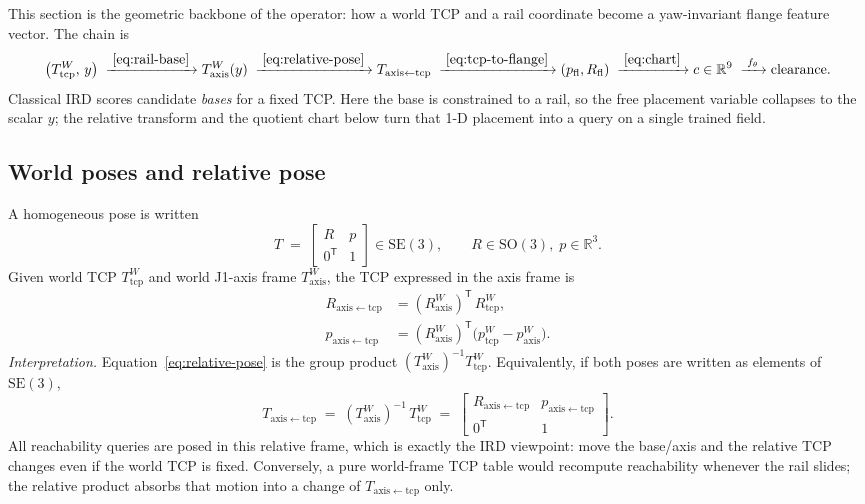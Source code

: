 \documentclass[11pt,a4paper]{article}
\newcommand{\SE}{\mathrm{SE}}
\newcommand{\SO}{\mathrm{SO}}
\newcommand{\R}{\mathbb{R}}
\newcommand{\Tcp}{T_{\mathrm{tcp}}}
\newcommand{\Taxis}{T_{\mathrm{axis}}}
\begin{document}
This section is the geometric backbone of the operator: how a world TCP and a
rail coordinate become a yaw-invariant flange feature vector. The chain is
\begin{equation}
\label{eq:pipeline}
  \bigl(\Tcp^{W},\, y\bigr)
  \;\xrightarrow{\;\eqref{eq:rail-base}\;}
  \Taxis^{W}(y)
  \;\xrightarrow{\;\eqref{eq:relative-pose}\;}
  T_{\mathrm{axis\leftarrow tcp}}
  \;\xrightarrow{\;\eqref{eq:tcp-to-flange}\;}
  (p_{\mathrm{fl}},R_{\mathrm{fl}})
  \;\xrightarrow{\;\eqref{eq:chart}\;}
  c\in\R^{9}
  \;\xrightarrow{\;f_{\theta}\;}
  \text{clearance}.
\end{equation}
Classical IRD scores candidate \emph{bases} for a fixed TCP. Here the base is
constrained to a rail, so the free placement variable collapses to the scalar
\(y\); the relative transform and the quotient chart below turn that 1-D
placement into a query on a single trained field.

\subsection{World poses and relative pose}
\label{sec:frames}

A homogeneous pose is written
\begin{equation}
\label{eq:pose-matrix}
  T
  \;=\;
  \begin{bmatrix}
    R & p \\
    0^{\mathsf T} & 1
  \end{bmatrix}
  \in\SE(3),
  \qquad
  R\in\SO(3),\; p\in\R^{3}.
\end{equation}
Given world TCP \(\Tcp^{W}\) and world J1-axis frame \(\Taxis^{W}\), the TCP
expressed in the axis frame is
\begin{equation}
\label{eq:relative-pose}
\begin{aligned}
  R_{\mathrm{axis\leftarrow tcp}}
  &=
  (R_{\mathrm{axis}}^{W})^{\mathsf T}\, R_{\mathrm{tcp}}^{W},
  \\
  p_{\mathrm{axis\leftarrow tcp}}
  &=
  (R_{\mathrm{axis}}^{W})^{\mathsf T}
  \bigl(p_{\mathrm{tcp}}^{W}-p_{\mathrm{axis}}^{W}\bigr).
\end{aligned}
\end{equation}
\emph{Interpretation.}
Equation~\eqref{eq:relative-pose} is the group product
\((\Taxis^{W})^{-1}\Tcp^{W}\). Equivalently, if both poses are written as
elements of \(\SE(3)\),
\begin{equation}
\label{eq:relative-group}
  T_{\mathrm{axis\leftarrow tcp}}
  \;=\;
  (\Taxis^{W})^{-1}\,\Tcp^{W}
  \;=\;
  \begin{bmatrix}
    R_{\mathrm{axis\leftarrow tcp}} & p_{\mathrm{axis\leftarrow tcp}} \\
    0^{\mathsf T} & 1
  \end{bmatrix}.
\end{equation}
All reachability queries are posed in this relative frame, which is exactly
the IRD viewpoint: move the base/axis and the relative TCP changes even if
the world TCP is fixed. Conversely, a pure world-frame TCP table would
recompute reachability whenever the rail slides; the relative product
absorbs that motion into a change of \(T_{\mathrm{axis\leftarrow tcp}}\) only.
\end{document}
